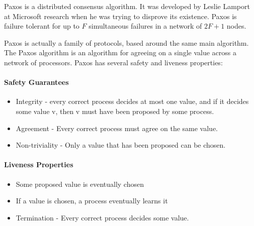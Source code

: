 \documentclass[12pt,twoside,notitlepage]{report}
\begin{document}
Paxos is a distributed consensus algorithm. It was developed by Leslie Lamport at Microsoft
research when he was trying to disprove its existence. Paxos is failure tolerant for up to $F$
simultaneous failures in a network of $2F + 1$ nodes.

Paxos is actually a family of protocols, based around the same main algorithm. The Paxos algorithm
is an algorithm for agreeing on a single value across a network of processors. Paxos has several
safety and liveness properties:

\paragraph{Safety Guarantees}

\begin{itemize}
\item Integrity - every correct process decides at most one value, and if it decides some value v,
	then v must have been proposed by some process.
\item Agreement - Every correct process must agree on the same value.
\item Non-triviality - Only a value that has been proposed can be chosen.
\end{itemize}

%
%
%

\paragraph{Liveness Properties}

\begin{itemize}
\item Some proposed value is eventually chosen
\item If a value is chosen, a process eventually learns it
\item Termination - Every correct process decides some value.
\end{itemize}

\end{document}
